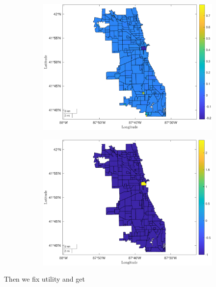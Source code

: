 \documentclass[12pt]{article}
\begin{document}
\begin{figure}[h!]
\centering
    \caption{Wages and Workers}
    \begin{subfigure}{0.75\textwidth}
         \centering
         \includegraphics[width=\textwidth]{Pset1/Figures/Single Agent/Counterfactual/Fix Population/wages.pdf}
    \end{subfigure}  
    \begin{subfigure}{0.75\textwidth}
         \centering
         \includegraphics[width=\linewidth]{Pset1/Figures/Single Agent/Counterfactual/Fix Population/workers.pdf}
    \end{subfigure}
    \label{fig:pop_wage_work}
\end{figure}
Then we fix utility and get 
\end{document}
